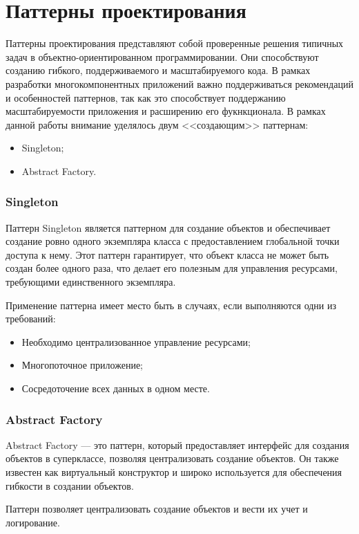 \section{Паттерны проектирования}

Паттерны проектирования представляют собой проверенные решения типичных задач в
объектно-ориентированном программировании. Они способствуют созданию гибкого,
поддерживаемого и масштабируемого кода. В рамках разработки многокомпонентных
приложений важно поддерживаться рекомендаций и особенностей паттернов, так как
это способствует поддержанию масштабируемости приложения и расширению его
фукнкционала. В рамках данной работы внимание уделялось двум <<создающим>>
паттернам: 
\begin{itemize}
  \item Singleton;
  \item Abstract Factory.
\end{itemize}

\subsubsection{Singleton}

Паттерн Singleton является паттерном для создание объектов и обеспечивает
создание ровно одного экземпляра класса с предоставлением глобальной точки
доступа к нему. Этот паттерн гарантирует, что объект класса не может быть создан
более одного раза, что делает его полезным для управления ресурсами, требующими
единственного экземпляра.

Применение паттерна имеет место быть в случаях, если выполняются одни из
требований:

\begin{itemize}
  \item Необходимо централизованное управление ресурсами;
  \item Многопоточное приложение;
  \item Сосредоточение всех данных в одном месте. 
\end{itemize}

\subsubsection{Abstract Factory}

Abstract Factory — это паттерн, который предоставляет интерфейс для создания
объектов в суперклассе, позволяя централизовать создание объектов. Он также
известен как виртуальный конструктор и широко используется для обеспечения
гибкости в создании объектов. 

Паттерн позволяет централизовать создание объектов и вести их учет и
логирование. 
